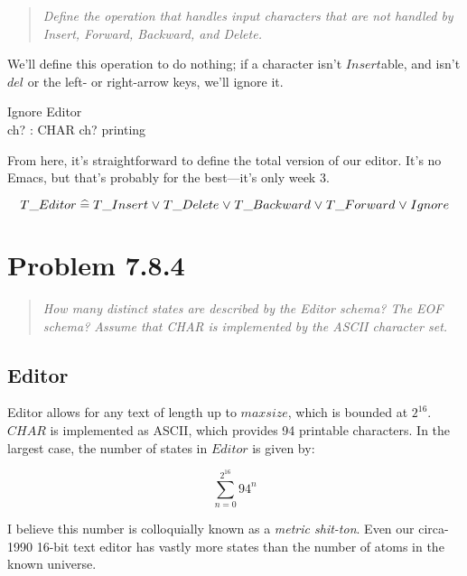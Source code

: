 \documentclass[11pt]{article}
\begin{document}
\begin{quote}
  \textit{Define the operation that handles input characters that are not handled by Insert,
    Forward, Backward, and Delete.}
\end{quote}

We'll define this operation to do nothing; if a character isn't $Insert$able, and isn't $del$ or the
left- or right-arrow keys, we'll ignore it.  

\begin{schema}{Ignore}
  Editor \\
  ch? : CHAR
  \where
  ch? \notin printing
\end{schema}

From here, it's straightforward to define the total version of our editor.  It's no Emacs, but
that's probably for the best---it's only week 3.

\[ T\_Editor \mathrel{\widehat=} T\_Insert \mathrel{\vee} T\_Delete \mathrel{\vee} T\_Backward \mathrel{\vee} T\_Forward \mathrel{\vee} Ignore \]


\section{Problem 7.8.4}

\begin{quote}
  \textit{How many distinct states are described by the Editor schema? The EOF schema? Assume that
    CHAR is implemented by the ASCII character set.}
\end{quote}

\subsection{Editor}
Editor allows for any text of length up to $maxsize$, which is bounded at $2^{16}$.  $CHAR$ is
implemented as ASCII, which provides 94 printable characters\footnotemark.  In the largest case, the
number of states in $Editor$ is given by:


\begin{equation*}
  \sum_{n=0}^{2^{16}} 94^n
\end{equation*}

I believe this number is colloquially known as a \textit{metric shit-ton}.  Even our circa-1990
16-bit text editor has vastly more states than the number of atoms in the known
universe\footnotemark.  

\end{document}
